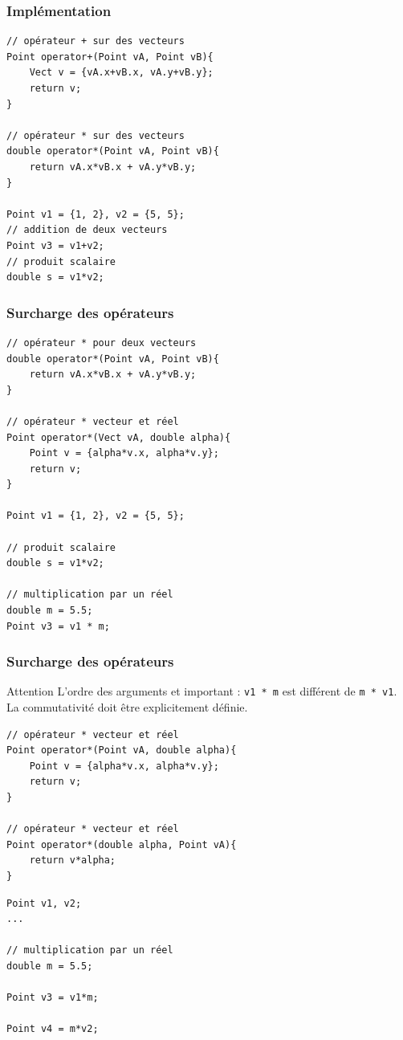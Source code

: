\begin{frame}[fragile=singleslide]
\frametitle{Implémentation}
\begin{verbatim}
// opérateur + sur des vecteurs
Point operator+(Point vA, Point vB){
    Vect v = {vA.x+vB.x, vA.y+vB.y};
    return v;
}

// opérateur * sur des vecteurs
double operator*(Point vA, Point vB){
    return vA.x*vB.x + vA.y*vB.y;
}

Point v1 = {1, 2}, v2 = {5, 5};
// addition de deux vecteurs
Point v3 = v1+v2;
// produit scalaire
double s = v1*v2;
\end{verbatim}
\end{frame}

\begin{frame}[fragile=singleslide]
\frametitle{Surcharge des opérateurs}

\begin{verbatim}
// opérateur * pour deux vecteurs
double operator*(Point vA, Point vB){
    return vA.x*vB.x + vA.y*vB.y;
}

// opérateur * vecteur et réel
Point operator*(Vect vA, double alpha){
    Point v = {alpha*v.x, alpha*v.y};
    return v;
}

Point v1 = {1, 2}, v2 = {5, 5};

// produit scalaire
double s = v1*v2;

// multiplication par un réel
double m = 5.5;
Point v3 = v1 * m;
\end{verbatim}
\end{frame}

\begin{frame}[fragile=singleslide]
\frametitle{Surcharge des opérateurs}
\begin{alertblock}{Attention}
L'ordre des arguments et important : \texttt{v1 * m} est différent de \texttt{m * v1}. La commutativité doit être explicitement définie.
\end{alertblock}
\begin{minipage}{0.47\linewidth}
\begin{verbatim}
// opérateur * vecteur et réel
Point operator*(Point vA, double alpha){
    Point v = {alpha*v.x, alpha*v.y};
    return v;
}

// opérateur * vecteur et réel
Point operator*(double alpha, Point vA){
    return v*alpha;
}
\end{verbatim}
\end{minipage}
\hfill
\begin{minipage}{0.47\linewidth}
\begin{verbatim}
Point v1, v2;
...

// multiplication par un réel
double m = 5.5;

Point v3 = v1*m;

Point v4 = m*v2;
\end{verbatim}
\end{minipage}
\end{frame}


